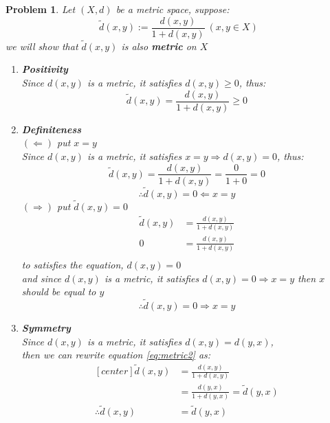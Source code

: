 \documentclass[a4paper,12pt]{article}
\newtheorem{prob}{Problem}[]
\begin{document}
\newpage
\begin{prob}
	Let $(X,d)$ be a metric space, suppose:
	\begin{equation}\label{eq:metric2}
	\tilde{d}(x,y) := \frac{d(x,y)}{1+d(x,y)}\ (x,y\in X)
	\end{equation}
	we will show that $\tilde{d}(x,y)$ is also \textbf{metric} on $X$
	
	\begin{enumerate}[label=(\alph*)]
		\item \textbf{Positivity}\\
		Since $d(x,y)$ is a metric, it satisfies $d(x,y) \geq 0$, thus:
		\begin{equation*}
		\tilde{d}(x,y) = \frac{d(x,y)}{1+d(x,y)} \geq 0
		\end{equation*}
		\item \textbf{Definiteness}\\
		$(\Leftarrow)$ put $x=y$\\
		Since $d(x,y)$ is a metric, it satisfies $x=y \Rightarrow d(x,y)=0$, thus:
		\begin{equation*}
		\tilde{d}(x,y) = \frac{d(x,y)}{1+d(x,y)} = \frac{0}{1+0} = 0
		\end{equation*}
		\begin{equation*}
		\therefore \tilde{d}(x,y) = 0 \Leftarrow x = y
		\end{equation*}
		$(\Rightarrow)$ put $\tilde{d}(x,y) = 0$\\
		\begin{equation*}
		\begin{aligned}
		\tilde{d}(x,y) &= \frac{d(x,y)}{1+d(x,y)}\\
		0 &= \frac{d(x,y)}{1+d(x,y)}\\
		\end{aligned}
		\end{equation*}
		to satisfies the equation, $d(x,y) = 0$\\
		and since $d(x,y)$ is a metric, it satisfies $d(x,y) = 0 \Rightarrow x=y$
		then $x$ should be equal to $y$\\
		\begin{equation*}
		\therefore \tilde{d}(x,y) = 0 \Rightarrow x=y
		\end{equation*}
		\item \textbf{Symmetry}\\
		Since $d(x,y)$ is a metric, it satisfies $d(x,y) = d(y,x)$,\\
		then we can rewrite equation \eqref{eq:metric2} as:
		\begin{equation*}
		\begin{aligned}[center]
		\tilde{d}(x,y) &= \frac{d(x,y)}{1+d(x,y)}\\
		&= \frac{d(y,x)}{1+d(y,x)} = \tilde{d}(y,x)\\
		\therefore \tilde{d}(x,y) &= \tilde{d}(y,x)
		\end{aligned}
		\end{equation*}
		

\end{enumerate}
\end{prob}
\end{document}
